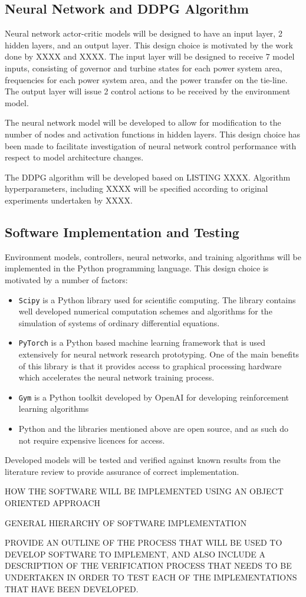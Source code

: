 \subsection{Neural Network and DDPG Algorithm}
Neural network actor-critic models will be designed to have an input layer, 2 hidden layers, and an output layer. This design choice is motivated by the work done by XXXX and XXXX. The input layer will be designed to receive 7 model inputs, consisting of governor and turbine states for each power system area, frequencies for each power system area, and the power transfer on the tie-line. The output layer will issue 2 control actions to be received by the environment model.

The neural network model will be developed to allow for modification to the number of nodes and activation functions in hidden layers. This design choice has been made to facilitate investigation of neural network control performance with respect to model architecture changes.

The DDPG algorithm will be developed based on LISTING XXXX. Algorithm hyperparameters, including XXXX will be specified according to original experiments undertaken by XXXX. 


\subsection{Software Implementation and Testing}
Environment models, controllers, neural networks, and training algorithms will be implemented in the Python programming language. This design choice is motivated by a number of factors:
\begin{itemize}
	\item \texttt{Scipy} is a Python library used for scientific computing. The library contains well developed numerical computation schemes and algorithms for the simulation of systems of ordinary differential equations.
	\item \texttt{PyTorch} is a Python based machine learning framework that is used extensively for neural network research prototyping. One of the main benefits of this library is that it provides access to graphical processing hardware which accelerates the neural network training process.
	\item \texttt{Gym} is a Python toolkit developed by OpenAI for developing reinforcement learning algorithms
	\item Python and the libraries mentioned above are open source, and as such do not require expensive licences for access.
\end{itemize}

Developed models will be tested and verified against known results from the literature review to provide assurance of correct implementation.

HOW THE SOFTWARE WILL BE IMPLEMENTED USING AN OBJECT ORIENTED APPROACH

GENERAL HIERARCHY OF SOFTWARE IMPLEMENTATION

PROVIDE AN OUTLINE OF THE PROCESS THAT WILL BE USED TO DEVELOP SOFTWARE TO IMPLEMENT, AND ALSO INCLUDE A DESCRIPTION OF THE VERIFICATION PROCESS THAT NEEDS TO BE UNDERTAKEN IN ORDER TO TEST EACH OF THE IMPLEMENTATIONS THAT HAVE BEEN DEVELOPED.